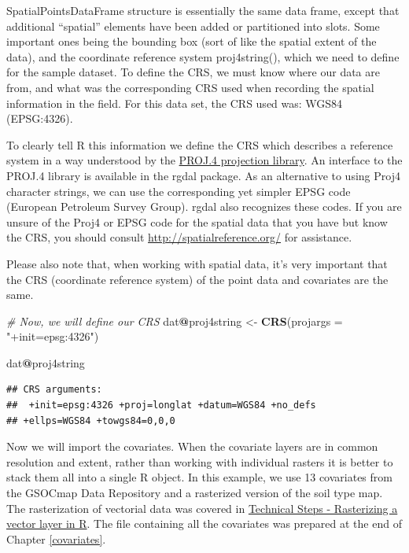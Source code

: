 \documentclass[10pt,b5paper,]{book}
\newenvironment{Shaded}{\begin{snugshade}}{\end{snugshade}}
\newcommand{\CommentTok}[1]{\textcolor[rgb]{0.56,0.35,0.01}{\textit{#1}}}
\newcommand{\DataTypeTok}[1]{\textcolor[rgb]{0.13,0.29,0.53}{#1}}
\newcommand{\KeywordTok}[1]{\textcolor[rgb]{0.13,0.29,0.53}{\textbf{#1}}}
\newcommand{\NormalTok}[1]{#1}
\newcommand{\OperatorTok}[1]{\textcolor[rgb]{0.81,0.36,0.00}{\textbf{#1}}}
\newcommand{\StringTok}[1]{\textcolor[rgb]{0.31,0.60,0.02}{#1}}
\theoremstyle{definition}
\theoremstyle{definition}
\theoremstyle{definition}
\theoremstyle{remark}
\begin{document}
SpatialPointsDataFrame structure is essentially the same data frame,
except that additional ``spatial'' elements have been added or
partitioned into slots. Some important ones being the bounding box (sort
of like the spatial extent of the data), and the coordinate reference
system proj4string(), which we need to define for the sample dataset. To
define the CRS, we must know where our data are from, and what was the
corresponding CRS used when recording the spatial information in the
field. For this data set, the CRS used was: WGS84 (EPSG:4326).

To clearly tell R this information we define the CRS which describes a
reference system in a way understood by the
\href{http://trac.osgeo.org/proj/}{PROJ.4 projection library}. An
interface to the PROJ.4 library is available in the rgdal package. As an
alternative to using Proj4 character strings, we can use the
corresponding yet simpler EPSG code (European Petroleum Survey Group).
rgdal also recognizes these codes. If you are unsure of the Proj4 or
EPSG code for the spatial data that you have but know the CRS, you
should consult \url{http://spatialreference.org/} for assistance.

Please also note that, when working with spatial data, it's very
important that the CRS (coordinate reference system) of the point data
and covariates are the same.

\begin{Shaded}
\begin{Highlighting}[]
\CommentTok{# Now, we will define our CRS}
\NormalTok{dat}\OperatorTok{@}\NormalTok{proj4string <-}\StringTok{ }\KeywordTok{CRS}\NormalTok{(}\DataTypeTok{projargs =} \StringTok{"+init=epsg:4326"}\NormalTok{)}

\NormalTok{dat}\OperatorTok{@}\NormalTok{proj4string}
\end{Highlighting}
\end{Shaded}

\begin{verbatim}
## CRS arguments:
##  +init=epsg:4326 +proj=longlat +datum=WGS84 +no_defs
## +ellps=WGS84 +towgs84=0,0,0
\end{verbatim}

Now we will import the covariates. When the covariate layers are in
common resolution and extent, rather than working with individual
rasters it is better to stack them all into a single R object. In this
example, we use 13 covariates from the GSOCmap Data Repository and a
rasterized version of the soil type map. The rasterization of vectorial
data was covered in
\protect\hyperlink{technical-steps---rasterizing-a-vector-layer-in-r}{Technical
Steps - Rasterizing a vector layer in R}. The file containing all the
covariates was prepared at the end of Chapter \ref{covariates}.
\end{document}

